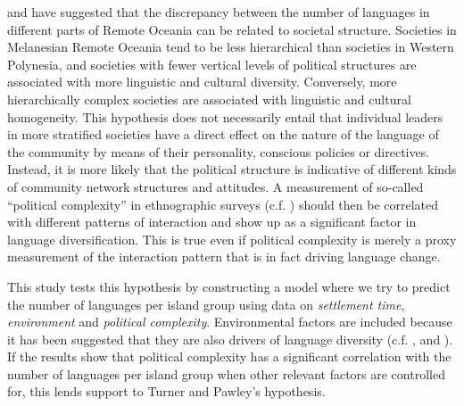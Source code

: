 \documentclass[a4paper,10pt]{article} %
\begin{document}
\citet{turner1884} and \citet{pawley81,pawley2007} have suggested that the discrepancy between the number of languages in different parts of Remote Oceania can be related to societal structure. Societies in Melanesian Remote Oceania tend to be less hierarchical than societies in Western Polynesia, and societies with fewer vertical levels of political structures are associated with more linguistic and cultural diversity. Conversely, more hierarchically complex societies are associated with linguistic and cultural homogeneity. This hypothesis does not necessarily entail that individual leaders in more stratified societies have a direct effect on the nature of the language of the community by means of their personality, conscious policies or directives. Instead, it is more likely that the political structure is indicative of different kinds of community network structures and attitudes. A measurement of so-called ``political complexity'' in ethnographic surveys (c.f. \citet{gray1998ethnographic}) should then be correlated with different patterns of interaction and show up as a significant factor in language diversification. This is true even if political complexity is merely a proxy measurement of the interaction pattern that is in fact driving language change. 

This study tests this hypothesis by constructing a model where we try to predict the number of languages per island group using data on \textit{settlement time}, \textit{environment} and \textit{political complexity}. Environmental factors are included because it has been suggested that they are also drivers of language diversity (c.f. \citet{NETTLE1998}, \citet{gavin2012island} and \citet{hua2019ecological}). If the results show that political complexity has a significant correlation with the number of languages per island group when other relevant factors are controlled for, this lends support to Turner and Pawley's hypothesis.
 
\end{document}
